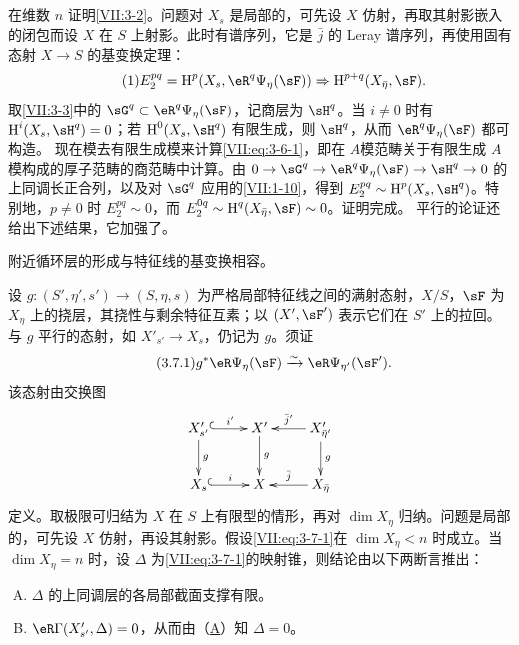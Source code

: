\subsection{}\label{VII:3-6}
在维数 $n$ 证明\ref{VII:3-2}。问题对 $X_s$ 是局部的，可先设 $X$ 仿射，再取其射影嵌入的闭包而设 $X$ 在 $S$ 上射影。此时有谱序列\cite[I 2.2.3]{sga7}，它是 $\bar j$ 的 Leray 谱序列，再使用固有态射 $X\to S$ 的基变换定理：
\begin{equation*}\tag{1}\label{VII:eq:3-6-1}
 E_2^{pq}=\h^p(X_s,\eR^q\Psi_\eta(\sF))\Rightarrow\h^{p+q}(X_{\bar\eta},\sF).
\end{equation*}
取\ref{VII:3-3}中的 $\sG^q\subset\eR^q\Psi_\eta(\sF)$，记商层为 $\sH^q$。当 $i\ne0$ 时有 $\h^i(X_s,\sH^q)=0$；若 $\h^0(X_s,\sH^q)$ 有限生成，则 $\sH^q$，从而 $\eR^q\Psi_\eta(\sF)$ 都可构造。
现在模去有限生成模来计算\eqref{VII:eq:3-6-1}，即在 $A$模范畴关于有限生成 $A$模构成的厚子范畴的商范畴中计算。由
$0\to\sG^q\to\eR^q\Psi_\eta(\sF)\to\sH^q\to0$ 的上同调长正合列，以及对 $\sG^q$ 应用的\ref{VII:1-10}，得到
$E_2^{pq}\sim\h^p(X_s,\sH^q)$。特别地，$p\ne0$ 时 $E_2^{pq}\sim0$，而
$E_2^{0q}\sim\h^q(X_{\bar\eta},\sF)\sim0$。证明完成。
平行的论证还给出下述结果，它加强了\cite[XIII 2.1.12、2.4.2]{sga7}。
\begin{proposition_}\label{VII:3-7}
附近循环层的形成与特征线的基变换相容。
\end{proposition_}
设 $g:(S',\eta',s')\to(S,\eta,s)$ 为严格局部特征线之间的满射态射，$X/S$，$\sF$ 为 $X_\eta$ 上的挠层，其挠性与剩余特征互素；以 $(X',\sF')$ 表示它们在 $S'$ 上的拉回。与 $g$ 平行的态射，如 $X'_{s'}\to X_s$，仍记为 $g$。须证
\begin{equation*}\tag{3.7.1}\label{VII:eq:3-7-1}
 g^\ast\eR\Psi_\eta(\sF)\iso\eR\Psi_{\eta'}(\sF').
\end{equation*}
该态射由交换图
\[\xymatrix{
 X'_{s'}\ar@{^{(}->}[r]^-{i'}\ar[d]^-g&X'\ar[d]^-g&X'_{\bar\eta'}\ar[l]_-{\bar j'}\ar[d]^-g\\
 X_s\ar@{^{(}->}[r]^-i&X&X_{\bar\eta}\ar[l]_-{\bar j}
}\]
定义。取极限可归结为 $X$ 在 $S$ 上有限型的情形，再对 $\dim X_\eta$ 归纳。问题是局部的，可先设 $X$ 仿射，再设其射影。假设\eqref{VII:eq:3-7-1}在 $\dim X_\eta<n$ 时成立。当 $\dim X_\eta=n$ 时，设 $\Delta$ 为\eqref{VII:eq:3-7-1}的映射锥，则结论由以下两断言推出：
\begin{enumerate}[(A)]
\item $\Delta$ 的上同调层的各局部截面支撑有限。\hypertarget{VII:3-A}{}
\item $\eR\Gamma(X'_{s'},\Delta)=0$，从而由（\hyperlink{VII:3-A}{A}）知 $\Delta=0$。\hypertarget{VII:3-B}{}
\end{enumerate}
